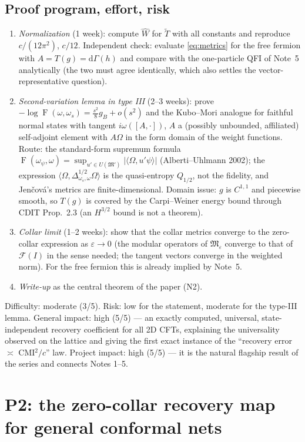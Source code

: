 \documentclass[11pt]{article}
\theoremstyle{accent}
\theoremstyle{definition}
\newcommand{\cF}{\mathcal{F}}
\newcommand{\cM}{\mathfrak{M}}
\newcommand{\eps}{\varepsilon}
\newcommand{\Fid}{\operatorname{F}}
\begin{document}
\subsection{Proof program, effort, risk}
\begin{enumerate}
\item \emph{Normalization} (1 week): compute \(\widehat W\) for \(\widetilde T\) with all constants and reproduce \(c/(12\pi^2)\), \(c/12\).  Independent check: evaluate \eqref{eq:metrics} for the free fermion with \(A=T(g)=\mathrm d\Gamma(h)\) and compare with the one-particle QFI of Note~5 analytically (the two must agree identically, which also settles the vector-representative question).
\item \emph{Second-variation lemma in type III} (2--3 weeks): prove \(-\log\Fid(\omega,\omega_s)=\frac{s^2}{8}g_B+o(s^2)\) and the Kubo--Mori analogue for faithful normal states with tangent \(i\omega([A,\cdot])\), \(A\) a (possibly unbounded, affiliated) self-adjoint element with \(A\Omega\) in the form domain of the weight functions.  Route: the standard-form supremum formula \(\Fid(\omega_\psi,\omega)=\sup_{u'\in U(\cM')}|\langle\Omega,u'\psi\rangle|\) (Alberti--Uhlmann 2002); the expression \(\langle\Omega,\Delta_{\omega_s,\omega}^{1/2}\Omega\rangle\) is the quasi-entropy \(Q_{1/2}\), not the fidelity, and Jen\v cov\'a's metrics are finite-dimensional.  Domain issue: \(g\) is \(C^{1,1}\) and piecewise smooth, so \(T(g)\) is covered by the Carpi--Weiner energy bound through CDIT Prop.~2.3 (an \(H^{3/2}\) bound is not a theorem).
\item \emph{Collar limit} (1--2 weeks): show that the collar metrics converge to the zero-collar expression as \(\eps\to0\) (the modular operators of \(\cM_\eps\) converge to that of \(\cF(I)\) in the sense needed; the tangent vectors converge in the weighted norm).  For the free fermion this is already implied by Note~5.
\item \emph{Write-up} as the central theorem of the paper (N2).
\end{enumerate}
Difficulty: moderate (3/5).  Risk: low for the statement, moderate for the type-III lemma.  General impact: high (5/5) --- an exactly computed, universal, state-independent recovery coefficient for all 2D CFTs, explaining the universality observed on the lattice and giving the first exact instance of the ``recovery error \(\asymp\) CMI\(^2/c\)'' law.  Project impact: high (5/5) --- it is the natural flagship result of the series and connects Notes 1--5.
\section{P2: the zero-collar recovery map for general conformal nets}\label{sec:P2}
\end{document}
